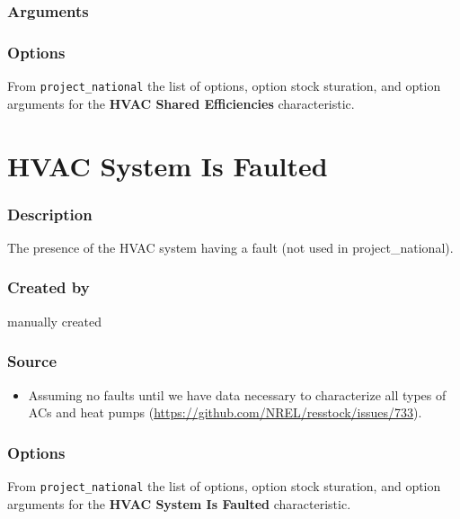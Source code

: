 \subsubsection{Arguments}\label{arguments-49}



\subsubsection{Options}\label{options-78}

From \texttt{project\_national} the list of options, option stock
sturation, and option arguments for the \textbf{HVAC Shared
Efficiencies} characteristic.



\section{HVAC System Is Faulted}\label{hvac_system_is_faulted}

\subsubsection{Description}\label{description-79}

The presence of the HVAC system having a fault (not used in
project\_national).

\subsubsection{Created by}\label{created-by-79}

manually created

\subsubsection{Source}\label{source-78}

\begin{itemize}
 
\item
  Assuming no faults until we have data necessary to characterize all
  types of ACs and heat pumps
  (\url{https://github.com/NREL/resstock/issues/733}).
\end{itemize}

\subsubsection{Options}\label{options-79}

From \texttt{project\_national} the list of options, option stock
sturation, and option arguments for the \textbf{HVAC System Is Faulted}
characteristic.

